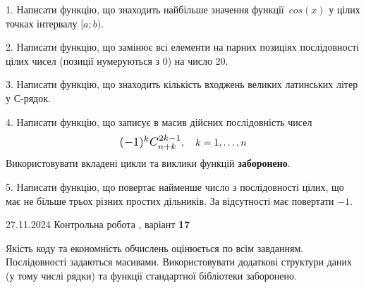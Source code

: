 \documentclass[12pt, ukrainian]{article}
\begin{document}
{{{{{{{{{{{{{{{{\vspace{2mm}

\begin {large}
1. Написати функцію, що знаходить найбільше значення функції~$cos(x)$ у цілих точках інтервалу $[a; b)$.

\vspace{2mm}


2. Написати функцію, що замінює всі елементи на парних позиціях послідовності цілих чисел (позиції нумеруються з 0) на число 20.

\vspace{2mm}


3. Написати функцію, що знаходить кількість входжень великих латинських літер у С-рядок.

\vspace{2mm}


4. 
Написати функцію, що записує в масив дійсних послідовність чисел
$$\scalebox{1.2}{$(-1)^{k}C_{n+k}^{2k-1}$}, \quad k=1,\ldots,n$$
Використовувати вкладені цикли та виклики функцій \textbf{заборонено}.

\vspace{2mm}


5. Написати функцію, що повертає найменше число з послідовності цілих, що має не більше трьох різних простих дільників. За відсутності має повертати $-1$.

\vspace{2mm}

\end{large}
\newpage
{{27.11.2024 Контрольна робота , варіант  \No \textbf { 17 }\par}}


{
Якість коду та економність обчислень оцінюється по всім завданням. Послідовності задаються масивами. Використовувати додаткові структури даних (у тому числі рядки) та функції стандартної бібліотеки заборонено.

\vspace{2mm}

}}}}}}}}}}}}}}}}}
\end{document}
